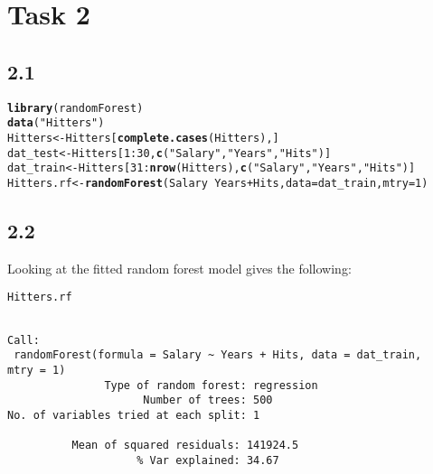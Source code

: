\documentclass[10pt, a4paper, english]{article}\usepackage[]{graphicx}\usepackage[dvipsnames]{xcolor}
\makeatletter
\newcommand{\hlnum}[1]{\textcolor[rgb]{0.686,0.059,0.569}{#1}}%
\newcommand{\hlstr}[1]{\textcolor[rgb]{0.192,0.494,0.8}{#1}}%
\newcommand{\hlopt}[1]{\textcolor[rgb]{0,0,0}{#1}}%
\newcommand{\hlstd}[1]{\textcolor[rgb]{0.345,0.345,0.345}{#1}}%
\newcommand{\hlkwb}[1]{\textcolor[rgb]{0.69,0.353,0.396}{#1}}%
\newcommand{\hlkwc}[1]{\textcolor[rgb]{0.333,0.667,0.333}{#1}}%
\newcommand{\hlkwd}[1]{\textcolor[rgb]{0.737,0.353,0.396}{\textbf{#1}}}%
\newenvironment{kframe}{%
 \def\at@end@of@kframe{}%
 \ifinner\ifhmode%
  \def\at@end@of@kframe{\end{minipage}}%
  \begin{minipage}{\columnwidth}%
 \fi\fi%
 \def\FrameCommand##1{\hskip\@totalleftmargin \hskip-\fboxsep
 \colorbox{shadecolor}{##1}\hskip-\fboxsep
     \hskip-\linewidth \hskip-\@totalleftmargin \hskip\columnwidth}%
 \MakeFramed {\advance\hsize-\width
   \@totalleftmargin\z@ \linewidth\hsize
   \@setminipage}}%
 {\par\unskip\endMakeFramed%
 \at@end@of@kframe}
\newenvironment{knitrout}{}{} %
\makeatother
\begin{document}
\section{Task 2}
\subsection{2.1}
\begin{knitrout}
\color{fgcolor}\begin{kframe}
\begin{alltt}
\hlkwd{library}\hlstd{(randomForest)}
\hlkwd{data}\hlstd{(}\hlstr{"Hitters"}\hlstd{)}
\hlstd{Hitters} \hlkwb{<-} \hlstd{Hitters[}\hlkwd{complete.cases}\hlstd{(Hitters),]}
\hlstd{dat_test} \hlkwb{<-} \hlstd{Hitters[}\hlnum{1}\hlopt{:}\hlnum{30}\hlstd{,} \hlkwd{c}\hlstd{(}\hlstr{"Salary"}\hlstd{,} \hlstr{"Years"}\hlstd{,} \hlstr{"Hits"}\hlstd{)]}
\hlstd{dat_train} \hlkwb{<-} \hlstd{Hitters[}\hlnum{31}\hlopt{:}\hlkwd{nrow}\hlstd{(Hitters),} \hlkwd{c}\hlstd{(}\hlstr{"Salary"}\hlstd{,} \hlstr{"Years"}\hlstd{,} \hlstr{"Hits"}\hlstd{)]}
\hlstd{Hitters.rf} \hlkwb{<-} \hlkwd{randomForest}\hlstd{(Salary} \hlopt{~} \hlstd{Years} \hlopt{+} \hlstd{Hits,} \hlkwc{data}\hlstd{=dat_train,} \hlkwc{mtry}\hlstd{=}\hlnum{1}\hlstd{)}
\end{alltt}
\end{kframe}
\end{knitrout}
\subsection{2.2}
Looking at the fitted random forest model gives the following:
\begin{knitrout}
\color{fgcolor}\begin{kframe}
\begin{alltt}
\hlstd{Hitters.rf}
\end{alltt}
\begin{verbatim}

Call:
 randomForest(formula = Salary ~ Years + Hits, data = dat_train,      mtry = 1) 
               Type of random forest: regression
                     Number of trees: 500
No. of variables tried at each split: 1

          Mean of squared residuals: 141924.5
                    % Var explained: 34.67
\end{verbatim}
\end{kframe}
\end{knitrout}
\end{document}
